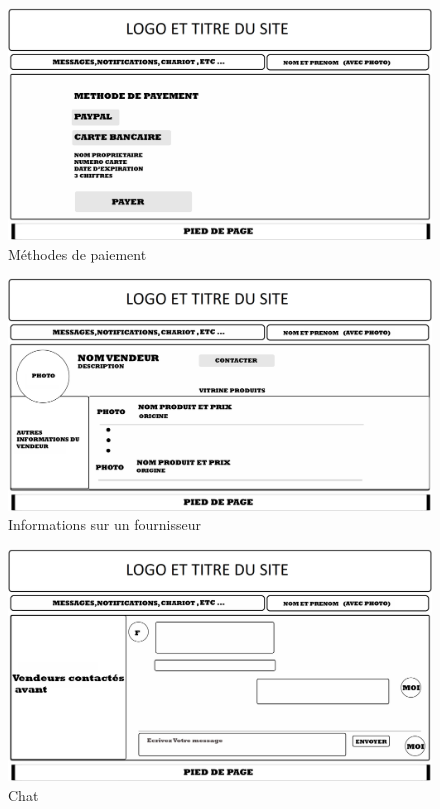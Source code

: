 \documentclass[a4paper,12pt]{report}
\theoremstyle{break}
\theoremstyle{break}
\theoremstyle{break}
\theoremstyle{break}
\theoremstyle{definition}
\theoremstyle{remark}
\begin{document}
\begin{appendices}
\begin{figure}[!ht]
  \centering
  \includegraphics[scale=0.25]{images/storyboard/04_4.jpg}
  \caption{Méthodes de paiement}
\end{figure}

\begin{figure}[!ht]
  \centering
  \includegraphics[scale=0.25]{images/storyboard/05.jpg}
  \caption{Informations sur un fournisseur}
\end{figure}

\begin{figure}[!ht]
  \centering
  \includegraphics[scale=0.25]{images/storyboard/05_1.jpg}
  \caption{Chat}
\end{figure}


\end{appendices}
\end{document}
